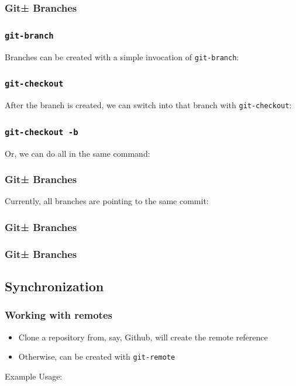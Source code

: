 \documentclass{beamer}
\begin{document}
\begin{frame}[fragile]
\frametitle{Git± Branches}

\end{frame}

\begin{frame}[fragile]
\frametitle{\texttt{git-branch}}
Branches can be created with a simple invocation of \texttt{git-branch}:

\end{frame}

\begin{frame}[fragile]
\frametitle{\texttt{git-checkout}}
After the branch is created, we can switch into that branch with
\texttt{git-checkout}:

\end{frame}

\begin{frame}[fragile]
\frametitle{\texttt{git-checkout -b}}
Or, we can do all in the same command:

\end{frame}

\begin{frame}[fragile]
\frametitle{Git± Branches}
Currently, all branches are pointing to the same commit:

\end{frame}

\begin{frame}[fragile]
\frametitle{Git± Branches}

\end{frame}

\begin{frame}[fragile]
\frametitle{Git± Branches}

\end{frame}

\subsection{Synchronization}
\begin{frame}[fragile]
\frametitle{Working with remotes}
\begin{itemize}
\item{Clone a repository from, say, Github, will create the remote reference}
\item{Otherwise, can be created with \texttt{git-remote}}
\end{itemize}
Example Usage:

\end{frame}
\end{document}
